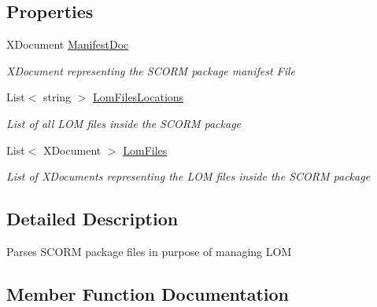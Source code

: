 \subsection*{Properties}
\begin{DoxyCompactItemize}
\item 
X\+Document \hyperlink{class_lom_editor_utils_1_1_parsed_scorm_af394da121e9b9e82adb87fa2dc6f2119}{Manifest\+Doc}
\begin{DoxyCompactList}\small\item\em X\+Document representing the S\+C\+O\+RM package manifest File \end{DoxyCompactList}\item 
List$<$ string $>$ \hyperlink{class_lom_editor_utils_1_1_parsed_scorm_a9fa64170cb8c2b953bc1db584ffe245c}{Lom\+Files\+Locations}
\begin{DoxyCompactList}\small\item\em List of all L\+OM files inside the S\+C\+O\+RM package \end{DoxyCompactList}\item 
List$<$ X\+Document $>$ \hyperlink{class_lom_editor_utils_1_1_parsed_scorm_a54f40e6a6b158dfc4ddeaf124b657e1a}{Lom\+Files}
\begin{DoxyCompactList}\small\item\em List of X\+Documents representing the L\+OM files inside the S\+C\+O\+RM package \end{DoxyCompactList}\end{DoxyCompactItemize}


\subsection{Detailed Description}
Parses S\+C\+O\+RM package files in purpose of managing L\+OM 



\subsection{Member Function Documentation}
\hypertarget{class_lom_editor_utils_1_1_parsed_scorm_a1d6075c98d793928e9e5d55767c41034}{}\label{class_lom_editor_utils_1_1_parsed_scorm_a1d6075c98d793928e9e5d55767c41034} 
